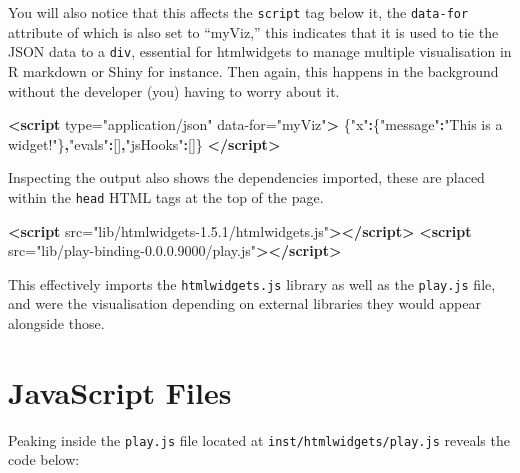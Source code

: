 \documentclass[
]{krantz}
\makeatletter
\newenvironment{Shaded}{\begin{snugshade}}{\end{snugshade}}
\newcommand{\KeywordTok}[1]{\textcolor[rgb]{0.27,0.27,0.27}{\textbf{#1}}}
\newcommand{\NormalTok}[1]{#1}
\newcommand{\OperatorTok}[1]{\textcolor[rgb]{0.43,0.43,0.43}{\textbf{#1}}}
\newcommand{\OtherTok}[1]{\textcolor[rgb]{0.37,0.37,0.37}{#1}}
\newcommand{\StringTok}[1]{\textcolor[rgb]{0.5,0.5,0.5}{#1}}
\newenvironment{kframe}{%
\medskip{}
\setlength{\fboxsep}{.8em}
 \def\at@end@of@kframe{}%
 \ifinner\ifhmode%
  \def\at@end@of@kframe{\end{minipage}}%
  \begin{minipage}{\columnwidth}%
 \fi\fi%
 \def\FrameCommand##1{\hskip\@totalleftmargin \hskip-\fboxsep
 \colorbox{shadecolor}{##1}\hskip-\fboxsep
     \hskip-\linewidth \hskip-\@totalleftmargin \hskip\columnwidth}%
 \MakeFramed {\advance\hsize-\width
   \@totalleftmargin\z@ \linewidth\hsize
   \@setminipage}}%
 {\par\unskip\endMakeFramed%
 \at@end@of@kframe}
\renewenvironment{Shaded}{\begin{kframe}}{\end{kframe}}
\makeatother
\begin{document}
You will also notice that this affects the \texttt{script} tag below it, the \texttt{data-for} attribute of which is also set to ``myViz,'' this indicates that it is used to tie the JSON data to a \texttt{div}, essential for htmlwidgets to manage multiple visualisation in R markdown or Shiny for instance. Then again, this happens in the background without the developer (you) having to worry about it.

\begin{Shaded}
\begin{Highlighting}[]
\KeywordTok{\textless{}script}\OtherTok{ type=}\StringTok{"application/json"} 
\OtherTok{  data{-}for=}\StringTok{"myViz"}\KeywordTok{\textgreater{}}
\NormalTok{  \{}\StringTok{"x"}\OperatorTok{:}\NormalTok{\{}\StringTok{"message"}\OperatorTok{:}\StringTok{"This is a widget!"}\NormalTok{\}}\OperatorTok{,}\StringTok{"evals"}\OperatorTok{:}\NormalTok{[]}\OperatorTok{,}\StringTok{"jsHooks"}\OperatorTok{:}\NormalTok{[]\}}
\KeywordTok{\textless{}/script\textgreater{}}
\end{Highlighting}
\end{Shaded}

Inspecting the output also shows the dependencies imported, these are placed within the \texttt{head} HTML tags at the top of the page.

\begin{Shaded}
\begin{Highlighting}[]
\KeywordTok{\textless{}script}\OtherTok{ src=}\StringTok{"lib/htmlwidgets{-}1.5.1/htmlwidgets.js"}\KeywordTok{\textgreater{}\textless{}/script\textgreater{}}
\KeywordTok{\textless{}script}\OtherTok{ src=}\StringTok{"lib/play{-}binding{-}0.0.0.9000/play.js"}\KeywordTok{\textgreater{}\textless{}/script\textgreater{}}
\end{Highlighting}
\end{Shaded}

This effectively imports the \texttt{htmlwidgets.js} library as well as the \texttt{play.js} file, and were the visualisation depending on external libraries they would appear alongside those.

\hypertarget{widgets-first-js-files}{%
\section{JavaScript Files}\label{widgets-first-js-files}}

Peaking inside the \texttt{play.js} file located at \texttt{inst/htmlwidgets/play.js} reveals the code below:
\end{document}

